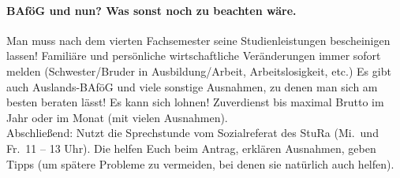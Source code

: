 \paragraph{BAföG und nun? Was sonst noch zu beachten wäre.}
Man muss nach dem vierten Fachsemester seine Studienleistungen bescheinigen lassen! Familiäre und persönliche wirtschaftliche Veränderungen immer sofort melden (Schwester/Bruder in Ausbildung/Arbeit, Arbeitslosigkeit, etc.) Es gibt auch Auslands-BAföG und viele sonstige Ausnahmen, zu denen man sich am besten beraten lässt! Es kann sich lohnen! Zuverdienst bis maximal  Brutto im Jahr oder  im Monat (mit vielen Ausnahmen).\\[5mm]

\noindent Abschließend: Nutzt die Sprechstunde vom Sozialreferat des \gls{StuRa} (Mi.\ und Fr.\ 11 -- 13 Uhr). Die helfen Euch beim Antrag, erklären Ausnahmen, geben Tipps (um spätere Probleme zu vermeiden, bei denen sie natürlich auch helfen).
